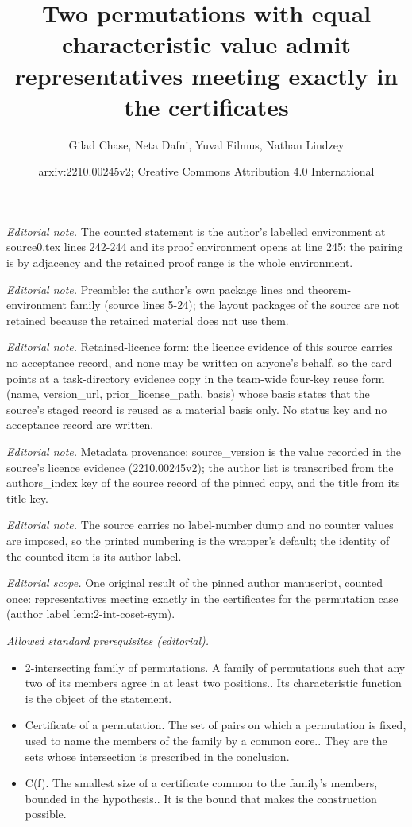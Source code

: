 \documentclass[10pt,a4paper]{article}
\title{Two permutations with equal characteristic value admit representatives meeting exactly in the certificates}
\author{Gilad Chase, Neta Dafni, Yuval Filmus, Nathan Lindzey}
\date{arxiv:2210.00245v2; Creative Commons Attribution 4.0 International}
\theoremstyle{definition}
\begin{document}
\maketitle
\noindent\textit{Editorial note.} The counted statement is the author's labelled environment at source0.tex lines 242-244 and its proof environment opens at line 245; the pairing is by adjacency and the retained proof range is the whole environment.\par\medskip
\noindent\textit{Editorial note.} Preamble: the author's own package lines and theorem-environment family (source lines 5-24); the layout packages of the source are not retained because the retained material does not use them.\par\medskip
\noindent\textit{Editorial note.} Retained-licence form: the licence evidence of this source carries no acceptance record, and none may be written on anyone's behalf, so the card points at a task-directory evidence copy in the team-wide four-key reuse form (name, version\_url, prior\_license\_path, basis) whose basis states that the source's staged record is reused as a material basis only. No status key and no acceptance record are written.\par\medskip
\noindent\textit{Editorial note.} Metadata provenance: source\_version is the value recorded in the source's licence evidence (2210.00245v2); the author list is transcribed from the authors\_index key of the source record of the pinned copy, and the title from its title key.\par\medskip
\noindent\textit{Editorial note.} The source carries no label-number dump and no counter values are imposed, so the printed numbering is the wrapper's default; the identity of the counted item is its author label.\par\medskip
\noindent\textit{Editorial scope.} One original result of the pinned author manuscript, counted once: representatives meeting exactly in the certificates for the permutation case (author label lem:2-int-coset-sym).\par\medskip
\noindent\textit{Allowed standard prerequisites (editorial).}\begin{itemize}
\item 2-intersecting family of permutations. A family of permutations such that any two of its members agree in at least two positions.. Its characteristic function is the object of the statement.
\item Certificate of a permutation. The set of pairs on which a permutation is fixed, used to name the members of the family by a common core.. They are the sets whose intersection is prescribed in the conclusion.
\item C(f). The smallest size of a certificate common to the family's members, bounded in the hypothesis.. It is the bound that makes the construction possible.
\end{itemize}\medskip
\end{document}
